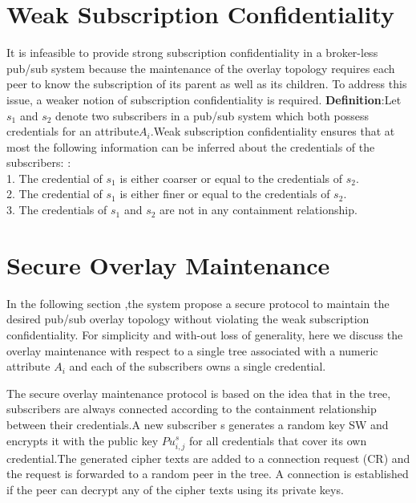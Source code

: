 \documentclass[MTech]{iitmdiss}
\begin{document}
\section{Weak Subscription Confidentiality}
It is infeasible to provide strong subscription confidentiality in a broker-less pub/sub system because the maintenance of the overlay topology requires each peer to know
the subscription of its parent as well as its children. To
address this issue, a weaker notion of subscription
confidentiality is required.
\textbf{Definition}:Let $s_1$ and $s_2$ denote two subscribers in a pub/sub
system which both possess credentials for an attribute$A_i$.Weak subscription confidentiality ensures that at most the
following information can be inferred about the credentials of
the subscribers:
:\\
1. The credential of $s_1$ is either coarser or equal to the
credentials of $s_2$.\\
2. The credential of $s_1$ is either finer or equal to the
credentials of $s_2$.\\
3. The credentials of $s_1$ and $s_2$ are not in any containment
relationship.
\section{Secure Overlay Maintenance}
In the following section ,the system propose a secure protocol to maintain
the desired pub/sub overlay topology without violating the
weak subscription confidentiality. For simplicity and with-out loss of generality, here we discuss the overlay maintenance with respect to  a single tree associated with a numeric attribute
$A_i$ and each of the subscribers owns a single credential.


The secure overlay maintenance protocol is based on the
idea that in the tree, subscribers are always connected
according to the containment relationship between their
credentials.A new subscriber s generates a random key SW and
encrypts it with the public key  $Pu_{i,j}^s$ for all credentials that
cover its own credential.The generated cipher texts are
added to a connection request (CR) and the request is
forwarded to a random peer in the tree. A connection is
established if the peer can decrypt any of the cipher texts
using its private keys.
\end{document}
